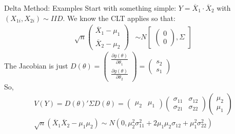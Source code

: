 \documentclass[aspectratio=169]{beamer}
\begin{document}
\begin{frame}{Delta Method: Examples}
Start with something simple: $Y= \overline{X}_1\cdot \overline{X}_2$ with $(X_{1i},X_{2i}) \sim IID$.
We know the CLT applies so that:
\begin{eqnarray*}
\sqrt{n}
\begin{pmatrix}
\overline{X}_1 - \mu_1\\
\overline{X}_2 - \mu_2
\end{pmatrix} &\sim  N
\begin{bmatrix}
\begin{pmatrix}
0\\
0
\end{pmatrix},
\Sigma
\end{bmatrix}
\end{eqnarray*}
The Jacobian is just $D(\theta) =  \begin{pmatrix}\frac{\partial g(\theta)}{\partial \theta_1} \\ \frac{\partial g(\theta)}{\partial \theta_2}  \end{pmatrix} =  \begin{pmatrix}s_2\\ s_1 \end{pmatrix}$\\
So,
\begin{eqnarray*}
V(Y) = D(\theta)' \Sigma D(\theta) =\begin{pmatrix} \mu_2 & \mu_1 \end{pmatrix}  \begin{pmatrix} \sigma_{11} & \sigma_{12} \\ \sigma_{21} & \sigma_{22} \end{pmatrix} \begin{pmatrix} \mu_2 \\\mu_1  
\end{pmatrix} \\
\sqrt{n} ( \overline{X}_1 \overline{X}_2 - \mu_1 \mu_2) \sim N(0,\mu_2^2 \sigma_{11}^2 + 2 \mu_1 \mu_2 \sigma_{12}  + \mu_1^2 \sigma_{22}^2)
\end{eqnarray*}
\end{frame}
\end{document}
